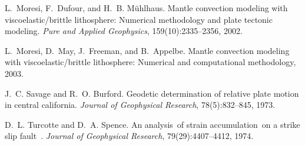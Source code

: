 
\begin{DoxyDescription}
\item[\label{_CITEREF_moresi_et_al_02}%
\mbox{[}1\mbox{]}]L.~Moresi, F.~Dufour, and H.~B. Mühlhaus. Mantle convection modeling with viscoelastic/brittle lithosphere\-: Numerical methodology and plate tectonic modeling. {\itshape Pure and Applied Geophysics}, 159(10)\-:2335--2356, 2002.


\item[\label{_CITEREF_moresi_et_al_03}%
\mbox{[}2\mbox{]}]L.~Moresi, D.~May, J.~Freeman, and B.~Appelbe. Mantle convection modeling with viscoelastic/brittle lithosphere\-: Numerical and computational methodology, 2003.


\item[\label{_CITEREF_savage_burford_73}%
\mbox{[}3\mbox{]}]J.~C. Savage and R.~O. Burford. Geodetic determination of relative plate motion in central california. {\itshape Journal of Geophysical Research}, 78(5)\-:832--845, 1973.


\item[\label{_CITEREF_turcotte_spence_74}%
\mbox{[}4\mbox{]}]D.~L. Turcotte and D.~A. Spence. An analysis of strain accumulation on a strike slip fault . {\itshape Journal of Geophysical Research}, 79(29)\-:4407--4412, 1974.


\end{DoxyDescription}